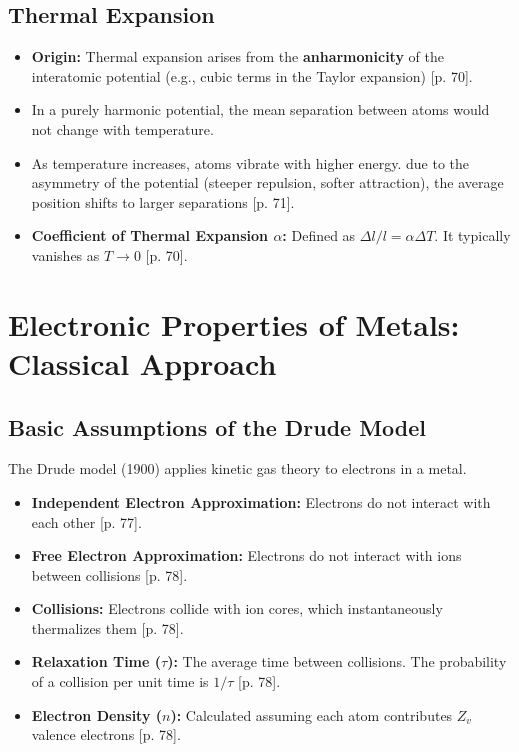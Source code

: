 \documentclass[a4paper,oneside,article]{memoir}
\begin{document}
\section{Thermal Expansion}
\begin{itemize}
    \item \textbf{Origin:} Thermal expansion arises from the \textbf{anharmonicity} of the interatomic potential (e.g., cubic terms in the Taylor expansion) [p. 70].
    \item In a purely harmonic potential, the mean separation between atoms would not change with temperature.
    \item As temperature increases, atoms vibrate with higher energy. due to the asymmetry of the potential (steeper repulsion, softer attraction), the average position shifts to larger separations [p. 71].
    \item \textbf{Coefficient of Thermal Expansion $\alpha$:} Defined as $\Delta l / l = \alpha \Delta T$. It typically vanishes as $T \to 0$ [p. 70].
\end{itemize}

\chapter{Electronic Properties of Metals: Classical Approach}

\section{Basic Assumptions of the Drude Model}
The Drude model (1900) applies kinetic gas theory to electrons in a metal.
\begin{itemize}
    \item \textbf{Independent Electron Approximation:} Electrons do not interact with each other [p. 77].
    \item \textbf{Free Electron Approximation:} Electrons do not interact with ions between collisions [p. 78].
    \item \textbf{Collisions:} Electrons collide with ion cores, which instantaneously thermalizes them [p. 78].
    \item \textbf{Relaxation Time ($\tau$):} The average time between collisions. The probability of a collision per unit time is $1/\tau$ [p. 78].
    \item \textbf{Electron Density ($n$):} Calculated assuming each atom contributes $Z_v$ valence electrons [p. 78].
\end{itemize}
\end{document}
